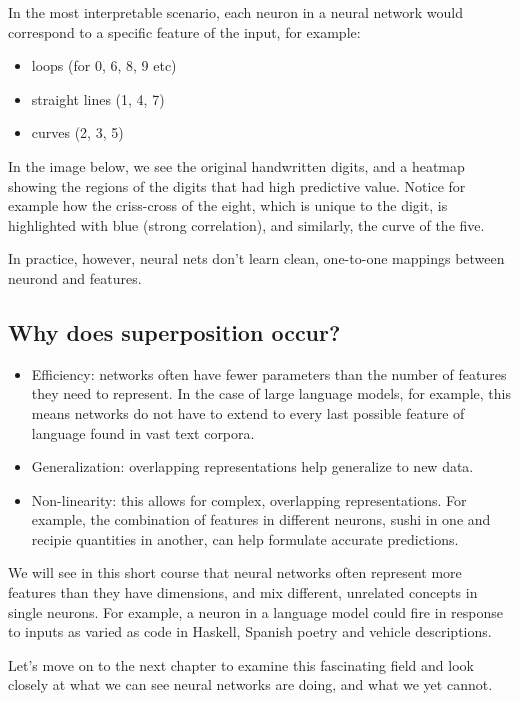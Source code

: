 \documentclass[
  letterpaper,
  DIV=11,
  numbers=noendperiod]{scrreprt}
\providecommand{\tightlist}{%
  \setlength{\itemsep}{0pt}\setlength{\parskip}{0pt}}\usepackage{longtable,booktabs,array}
\begin{document}
In the most interpretable scenario, each neuron in a neural network
would correspond to a specific feature of the input, for example:

\begin{itemize}
\tightlist
\item
  loops (for 0, 6, 8, 9 etc)
\item
  straight lines (1, 4, 7)
\item
  curves (2, 3, 5)
\end{itemize}

In the image below, we see the original handwritten digits, and a
heatmap showing the regions of the digits that had high predictive
value. Notice for example how the criss-cross of the eight, which is
unique to the digit, is highlighted with blue (strong correlation), and
similarly, the curve of the five.

In practice, however, neural nets don't learn clean, one-to-one mappings
between neurond and features.

\subsection{Why does superposition
occur?}\label{why-does-superposition-occur}

\begin{itemize}
\item
  Efficiency: networks often have fewer parameters than the number of
  features they need to represent. In the case of large language models,
  for example, this means networks do not have to extend to every last
  possible feature of language found in vast text corpora.
\item
  Generalization: overlapping representations help generalize to new
  data.
\item
  Non-linearity: this allows for complex, overlapping representations.
  For example, the combination of features in different neurons, sushi
  in one and recipie quantities in another, can help formulate accurate
  predictions.
\end{itemize}

We will see in this short course that neural networks often represent
more features than they have dimensions, and mix different, unrelated
concepts in single neurons. For example, a neuron in a language model
could fire in response to inputs as varied as code in Haskell, Spanish
poetry and vehicle descriptions.

Let's move on to the next chapter to examine this fascinating field and
look closely at what we can see neural networks are doing, and what we
yet cannot.
\end{document}
